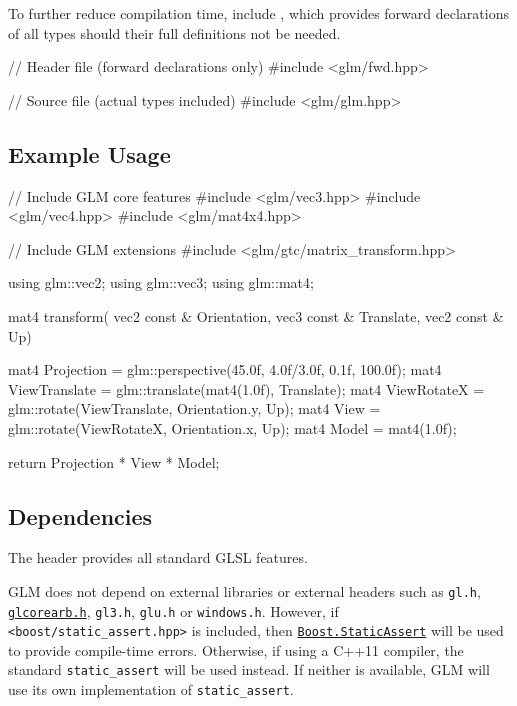 \documentclass{scrartcl}
\numberwithin{figure}{subsection}
\begin{document}
To further reduce compilation time, include , which provides forward declarations of all types should their full definitions not be needed.

\begin{cppcode}
// Header file (forward declarations only)
#include <glm/fwd.hpp>
\end{cppcode}

\begin{cppcode}
// Source file (actual types included)
#include <glm/glm.hpp>
\end{cppcode}

\subsection{Example Usage}

\begin{cppcode}
// Include GLM core features
#include <glm/vec3.hpp>
#include <glm/vec4.hpp>
#include <glm/mat4x4.hpp>

// Include GLM extensions
#include <glm/gtc/matrix_transform.hpp>

using glm::vec2;
using glm::vec3;
using glm::mat4;

mat4 transform(
  vec2 const & Orientation, 
  vec3 const & Translate,
  vec2 const & Up)
{
  mat4 Projection = glm::perspective(45.0f, 4.0f/3.0f, 0.1f, 100.0f);
  mat4 ViewTranslate = glm::translate(mat4(1.0f), Translate);
  mat4 ViewRotateX = glm::rotate(ViewTranslate, Orientation.y, Up);
  mat4 View = glm::rotate(ViewRotateX, Orientation.x, Up);
  mat4 Model = mat4(1.0f);
        
  return Projection * View * Model;
}
\end{cppcode}


\subsection{Dependencies}

The  header provides all standard GLSL features.

GLM does not depend on external libraries or external headers such as \verb|gl.h|, \href{http://www.opengl.org/registry/api/GL/glcorearb.h}{\texttt{glcorearb.h}}, \verb|gl3.h|, \verb|glu.h| or \verb|windows.h|. However, if \verb|<boost/static_assert.hpp>| is included, then \href{http://www.boost.org/doc/libs/release/libs/static_assert/}{\texttt{Boost.StaticAssert}} will be used to provide compile-time errors.  Otherwise, if using a C++11 compiler, the standard \verb|static_assert| will be used instead. If neither is available, GLM will use its own implementation of \verb|static_assert|.
\end{document}
